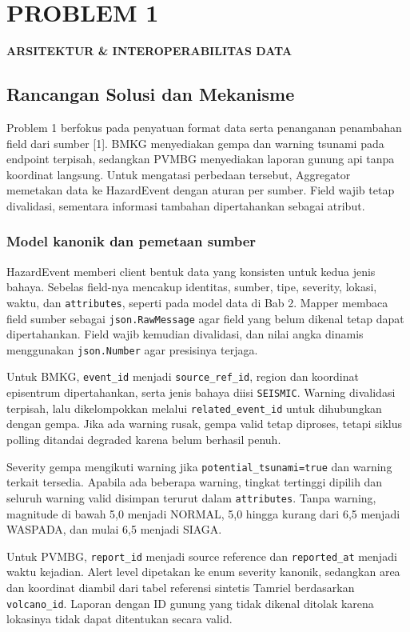 \chapter{PROBLEM 1}
\begin{center}\large\bfseries ARSITEKTUR \& INTEROPERABILITAS DATA\end{center}

\section{Rancangan Solusi dan Mekanisme}
Problem 1 berfokus pada penyatuan format data serta penanganan penambahan field dari sumber [1]. BMKG menyediakan gempa dan warning tsunami pada endpoint terpisah, sedangkan PVMBG menyediakan laporan gunung api tanpa koordinat langsung. Untuk mengatasi perbedaan tersebut, Aggregator memetakan data ke HazardEvent dengan aturan per sumber. Field wajib tetap divalidasi, sementara informasi tambahan dipertahankan sebagai atribut.

\subsection{Model kanonik dan pemetaan sumber}
HazardEvent memberi client bentuk data yang konsisten untuk kedua jenis bahaya. Sebelas field-nya mencakup identitas, sumber, tipe, severity, lokasi, waktu, dan \texttt{attributes}, seperti pada model data di Bab 2. Mapper membaca field sumber sebagai \texttt{json.RawMessage} agar field yang belum dikenal tetap dapat dipertahankan. Field wajib kemudian divalidasi, dan nilai angka dinamis menggunakan \texttt{json.Number} agar presisinya terjaga.

Untuk BMKG, \texttt{event\_id} menjadi \texttt{source\_ref\_id}, region dan koordinat episentrum dipertahankan, serta jenis bahaya diisi \texttt{SEISMIC}. Warning divalidasi terpisah, lalu dikelompokkan melalui \texttt{related\_event\_id} untuk dihubungkan dengan gempa. Jika ada warning rusak, gempa valid tetap diproses, tetapi siklus polling ditandai degraded karena belum berhasil penuh.

Severity gempa mengikuti warning jika \texttt{potential\_tsunami=true} dan warning terkait tersedia. Apabila ada beberapa warning, tingkat tertinggi dipilih dan seluruh warning valid disimpan terurut dalam \texttt{attributes}. Tanpa warning, magnitude di bawah 5,0 menjadi NORMAL, 5,0 hingga kurang dari 6,5 menjadi WASPADA, dan mulai 6,5 menjadi SIAGA.

Untuk PVMBG, \texttt{report\_id} menjadi source reference dan \texttt{reported\_at} menjadi waktu kejadian. Alert level dipetakan ke enum severity kanonik, sedangkan area dan koordinat diambil dari tabel referensi sintetis Tamriel berdasarkan \texttt{volcano\_id}. Laporan dengan ID gunung yang tidak dikenal ditolak karena lokasinya tidak dapat ditentukan secara valid.

